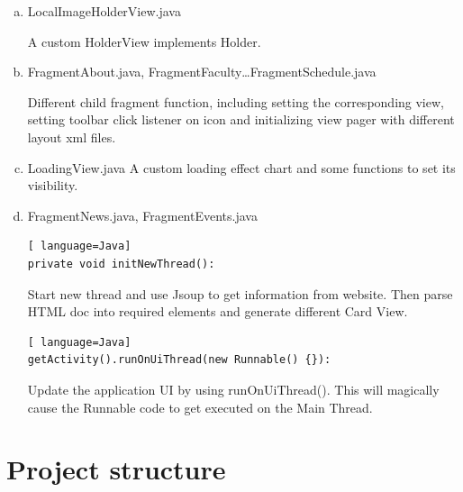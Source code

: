 \documentclass{article}
\begin{document}
\begin{enumerate}[a)]
    \begin{lstlisting}[ language=Java]
private void initConvenientBanner(View view):
    \end{lstlisting}

    Use ConvenientBanner and LocalImageHolderView to 
    complete the custom rotation effect with pictures.

    \begin{lstlisting}[ language=Java]
private void initTextViewClick(View view):
    \end{lstlisting}

    Set textView click listener to change fragment view.

    \item LocalImageHolderView.java
    
    A custom HolderView implements Holder.

    \item FragmentAbout.java, FragmentFaculty…FragmentSchedule.java
    
    Different child fragment function, 
    including setting the corresponding view, 
    setting toolbar click listener on icon and 
    initializing view pager with different layout xml files.

    \item LoadingView.java
    A custom loading effect chart and some functions to set its visibility.

    \item FragmentNews.java, FragmentEvents.java
    
    \begin{lstlisting}[ language=Java]
private void initNewThread():
    \end{lstlisting}

    Start new thread and use Jsoup to get information from website. 
    Then parse HTML doc into required elements and 
    generate different Card View.

    \begin{lstlisting}[ language=Java]
getActivity().runOnUiThread(new Runnable() {}):
    \end{lstlisting}

    Update the application UI by using runOnUiThread(). 
    This will magically cause the Runnable code to 
    get executed on the Main Thread.
        
    \end{enumerate}

    \section{Project structure}
\end{document}
